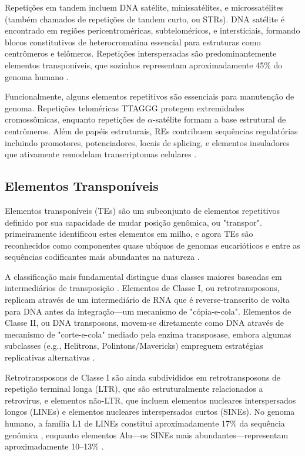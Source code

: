 Repetições em tandem incluem DNA satélite, minissatélites, e microssatélites (também chamados de repetições de tandem curto, ou STRs). DNA satélite é encontrado em regiões pericentroméricas, subteloméricos, e intersticiais, formando blocos constitutivos de heterocromatina essencial para estruturas como centrômeros e telômeros. Repetições interspersadas são predominantemente elementos transponíveis, que sozinhos representam aproximadamente 45\% do genoma humano \parencite{ruizruano2023}.

Funcionalmente, alguns elementos repetitivos são essenciais para manutenção de genoma. Repetições teloméricas TTAGGG protegem extremidades cromossômicas, enquanto repetições de $\alpha$-satélite formam a base estrutural de centrômeros. Além de papéis estruturais, REs contribuem sequências regulatórias incluindo promotores, potenciadores, locais de splicing, e elementos insuladores que ativamente remodelam transcriptomas celulares \parencite{rebollo2012,chuong2017,lu2020}.

\subsection{Elementos Transponíveis}

Elementos transponíveis (TEs) são um subconjunto de elementos repetitivos definido por sua capacidade de mudar posição genômica, ou "transpor". \textcite{mcclintock1950} primeiramente identificou estes elementos em milho, e agora TEs são reconhecidos como componentes quase ubíquos de genomas eucarióticos e entre as sequências codificantes mais abundantes na natureza \parencite{hayward2022,wells2020}.

A classificação mais fundamental distingue duas classes maiores baseadas em intermediários de transposição \parencite{wicker2007}. Elementos de Classe I, ou retrotransposons, replicam através de um intermediário de RNA que é reverse-transcrito de volta para DNA antes da integração---um mecanismo de "cópia-e-cola". Elementos de Classe II, ou DNA transposons, movem-se diretamente como DNA através de mecanismo de "corte-e-cola" mediado pela enzima transposase, embora algumas subclasses (e.g., Helitrons, Polintons/Mavericks) empreguem estratégias replicativas alternativas \parencite{kapitonov2006,feschotte2007}.

Retrotransposons de Classe I são ainda subdivididos em retrotransposons de repetição terminal longa (LTR), que são estruturalmente relacionados a retrovírus, e elementos não-LTR, que incluem elementos nucleares interspersados longos (LINEs) e elementos nucleares interspersados curtos (SINEs). No genoma humano, a família L1 de LINEs constitui aproximadamente 17\% da sequência genômica \parencite{finnegan1989}, enquanto elementos Alu---os SINEs mais abundantes---representam aproximadamente 10--13\% \parencite{batzer2002,dewannieux2003}.

